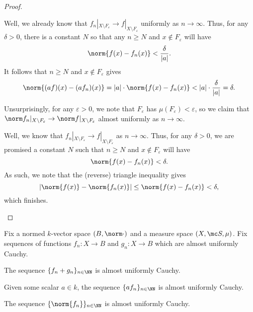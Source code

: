 \documentclass[../notes.tex]{subfiles}
\begin{document}
\begin{proof}
\begin{listalph}
		Well, we already know that $f_n|_{X\setminus F_\varepsilon}\to f|_{X\setminus F_\varepsilon}$ uniformly as $n\to\infty$. Thus, for any $\delta>0$, there is a constant $N$ so that any $n\ge N$ and $x\notin F_\varepsilon$ will have
		\[\norm{f(x)-f_n(x)}<\frac\delta{|a|}.\]
		It follows that $n\ge N$ and $x\notin F_\varepsilon$ gives
		\[\norm{(af)(x)-(af_n)(x)}=|a|\cdot\norm{f(x)-f_n(x)}<|a|\cdot\frac\delta{|a|}=\delta.\]

		\item Unsurprisingly, for any $\varepsilon>0$, we note that $F_\varepsilon$ has $\mu(F_\varepsilon)<\varepsilon$, so we claim that $\norm f_n|_{X\setminus F_\varepsilon}\to\norm f|_{X\setminus F_\varepsilon}$ almost uniformly as $n\to\infty$.

		Well, we know that $f_n|_{X\setminus F_\varepsilon}\to f|_{X\setminus F_\varepsilon}$ as $n\to\infty$. Thus, for any $\delta>0$, we are promised a constant $N$ such that $n\ge N$ and $x\notin F_\varepsilon$ will have
		\[\norm{f(x)-f_n(x)}<\delta.\]
		As such, we note that the (reverse) triangle inequality gives
		\[|\norm{f(x)}-\norm{f_n(x)}|\le\norm{f(x)-f_n(x)}<\delta,\]
		which finishes.
		\qedhere
	\end{listalph}
\end{proof}
\begin{lemma}
	Fix a normed $k$-vector space $(B,\norm\cdot)$ and a measure space $(X,\mc S,\mu)$. Fix sequences of functions $f_n\colon X\to B$ and $g_n\colon X\to B$ which are almost uniformly Cauchy.
	\begin{listalph}
		\item The sequence $\{f_n+g_n\}_{n\in\NN}$ is almost uniformly Cauchy.
		\item Given some scalar $a\in k$, the sequence $\{af_n\}_{n\in\NN}$ is almost uniformly Cauchy.
		\item The sequence $\{\norm{f_n}\}_{n\in\NN}$ is almost uniformly Cauchy.
	\end{listalph}
\end{lemma}
\end{document}
